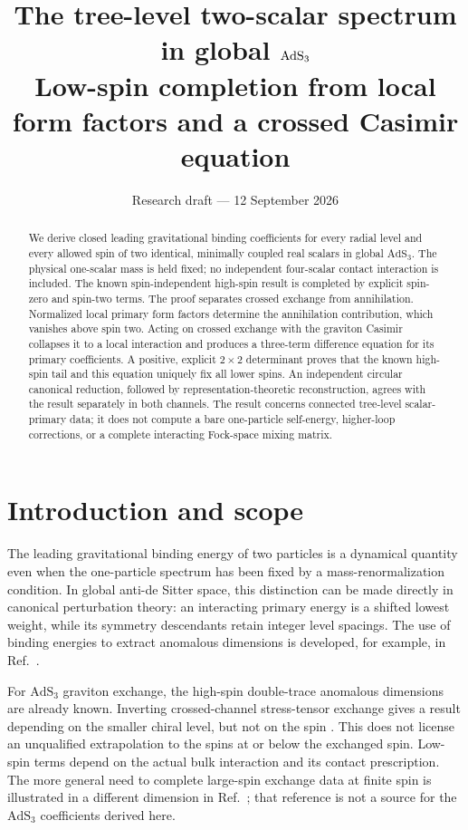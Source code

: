 \documentclass[11pt,a4paper]{article}
\title{The tree-level two-scalar spectrum in global $\AdS_3$\\[5pt]
\large Low-spin completion from local form factors and a crossed Casimir equation}
\author{}
\date{Research draft --- 12 September 2026}
\numberwithin{equation}{section}
\theoremstyle{remark}\newtheorem{remark}[theorem]{Remark}
\newcommand{\AdS}{\mathrm{AdS}}
\begin{document}
\maketitle
\vspace{-15pt}
\begin{abstract}
We derive closed leading gravitational binding coefficients for every radial level and every allowed spin of two identical, minimally coupled real scalars in global $\AdS_3$. The physical one-scalar mass is held fixed; no independent four-scalar contact interaction is included. The known spin-independent high-spin result is completed by explicit spin-zero and spin-two terms. The proof separates crossed exchange from annihilation. Normalized local primary form factors determine the annihilation contribution, which vanishes above spin two. Acting on crossed exchange with the graviton Casimir collapses it to a local interaction and produces a three-term difference equation for its primary coefficients. A positive, explicit $2\times2$ determinant proves that the known high-spin tail and this equation uniquely fix all lower spins. An independent circular canonical reduction, followed by representation-theoretic reconstruction, agrees with the result separately in both channels. The result concerns connected tree-level scalar-primary data; it does not compute a bare one-particle self-energy, higher-loop corrections, or a complete interacting Fock-space mixing matrix.
\end{abstract}

\section{Introduction and scope}

The leading gravitational binding energy of two particles is a dynamical quantity even when the one-particle spectrum has been fixed by a mass-renormalization condition. In global anti-de Sitter space, this distinction can be made directly in canonical perturbation theory: an interacting primary energy is a shifted lowest weight, while its symmetry descendants retain integer level spacings. The use of binding energies to extract anomalous dimensions is developed, for example, in Ref.~\cite{FS}.

For $\AdS_3$ graviton exchange, the high-spin double-trace anomalous dimensions are already known. Inverting crossed-channel stress-tensor exchange gives a result depending on the smaller chiral level, but not on the spin \cite{KSS,CH}. This does not license an unqualified extrapolation to the spins at or below the exchanged spin. Low-spin terms depend on the actual bulk interaction and its contact prescription. The more general need to complete large-spin exchange data at finite spin is illustrated in a different dimension in Ref.~\cite{ABP}; that reference is not a source for the $\AdS_3$ coefficients derived here.
\end{document}
